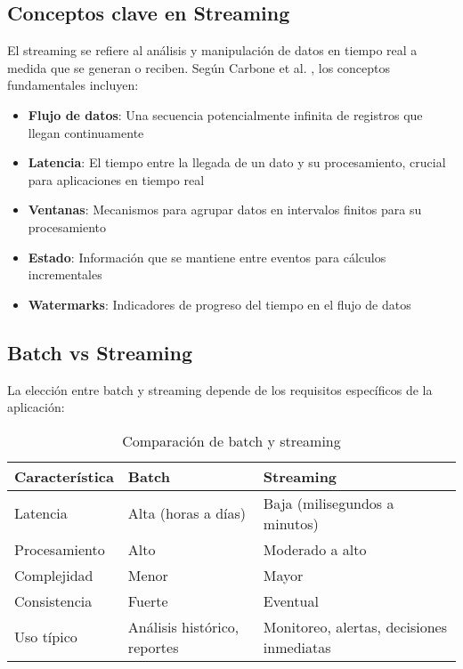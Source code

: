 \subsection{Conceptos clave en Streaming}

El streaming se refiere al análisis y manipulación de datos en tiempo real a medida que se generan o reciben. Según Carbone et al. \parencite{carbone2015apache}, los conceptos fundamentales incluyen:

\begin{itemize}
    \item \textbf{Flujo de datos}: Una secuencia potencialmente infinita de registros que llegan continuamente \parencite{akidau2015dataflow}
    \item \textbf{Latencia}: El tiempo entre la llegada de un dato y su procesamiento, crucial para aplicaciones en tiempo real \parencite{akidau2015dataflow}
    \item \textbf{Ventanas}: Mecanismos para agrupar datos en intervalos finitos para su procesamiento \parencite{akidau2015dataflow}
    \item \textbf{Estado}: Información que se mantiene entre eventos para cálculos incrementales \parencite{carbone2015apache}
    \item \textbf{Watermarks}: Indicadores de progreso del tiempo en el flujo de datos \parencite{akidau2015dataflow}
\end{itemize}
\newpage
\subsection{Batch vs Streaming}

La elección entre batch y streaming depende de los requisitos específicos de la aplicación:

\begin{table}[h]
\centering
\begin{tabular}{|p{3cm}|p{5cm}|p{5cm}|}
\hline
\textbf{Característica} & \textbf{Batch} & \textbf{Streaming} \\
\hline
Latencia & Alta (horas a días) & Baja (milisegundos a minutos) \\
\hline
Procesamiento & Alto & Moderado a alto \\
\hline
Complejidad & Menor & Mayor \\
\hline
Consistencia & Fuerte & Eventual \\
\hline
Uso típico & Análisis histórico, reportes & Monitoreo, alertas, decisiones inmediatas \\
\hline
\end{tabular}
\caption{Comparación de batch y streaming}
\label{tab:batch_vs_streaming}
\end{table}

